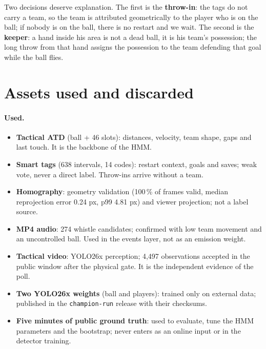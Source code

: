 \documentclass[10pt,a4paper]{article}
\begin{document}
Two decisions deserve explanation. The first is the \textbf{throw-in}: the tags do not carry
a team, so the team is attributed geometrically to the player who is on the ball; if nobody
is on the ball, there is no restart and we wait. The second is the \textbf{keeper}: a hand
inside his area is not a dead ball, it is his team's possession; the long throw from that
hand assigns the possession to the team defending that goal while the ball flies.
\section{Assets used and discarded}

\paragraph{Used.}
\begin{itemize}
\item \textbf{Tactical ATD} (ball + 46 slots): distances, velocity, team shape, gaps and
last touch. It is the backbone of the HMM.
\item \textbf{Smart tags} (638 intervals, 14 codes): restart context, goals and saves; weak
vote, never a direct label. Throw-ins arrive without a team.
\item \textbf{Homography}: geometry validation (100\,\% of frames valid, median reprojection
error 0.24 px, p99 4.81 px) and viewer projection; not a label source.
\item \textbf{MP4 audio}: 274 whistle candidates; confirmed with low team movement and an
uncontrolled ball. Used in the events layer, not as an emission weight.
\item \textbf{Tactical video}: YOLO26x perception; 4,497 observations accepted in the public
window after the physical gate. It is the independent evidence of the poll.
\item \textbf{Two YOLO26x weights} (ball and players): trained only on external data;
published in the \texttt{champion-run} release with their checksums.
\item \textbf{Five minutes of public ground truth}: used to evaluate, tune the HMM
parameters and the bootstrap; never enters as an online input or in the detector training.
\end{itemize}
\end{document}
